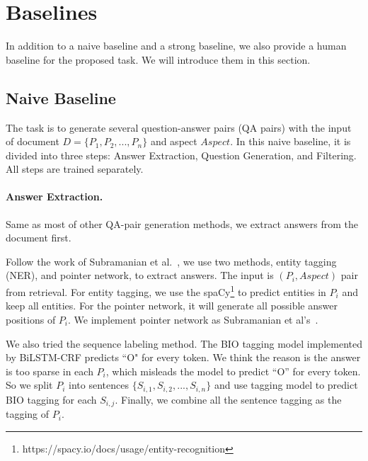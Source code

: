 \section{Baselines}
In addition to a naive baseline and a strong baseline, we also provide a human baseline for the proposed task. We will introduce them in this section.

\subsection{Naive Baseline} The task is to generate several question-answer pairs (QA pairs) with the input of document $D=\{P_1, P_2, ... , P_n\}$ and aspect $Aspect$. In this naive baseline, it is divided into three steps: Answer Extraction, Question Generation, and Filtering. All steps are trained separately.

\paragraph{Answer Extraction.} Same as most of other QA-pair generation methods, we extract answers from the document first.

Follow the work of Subramanian et al.~, we use two methods, entity tagging (NER), and pointer network, to extract answers.
The input is $(P_i, Aspect)$ pair from retrieval. For entity tagging, we use the spaCy\footnote{https://spacy.io/docs/usage/entity-recognition} to predict entities in $P_i$ and keep all entities. For the pointer network, it will generate all possible answer positions of $P_i$. We implement pointer network as Subramanian et al's~. 

We also tried the sequence labeling method. The BIO tagging model implemented by BiLSTM-CRF predicts ``O" for every token. We think the reason is the answer is too sparse in each $P_i$, which misleads the model to predict ``O'' for every token. So we split $P_i$ into sentences $\{S_{i,1}, S_{i,2}, ..., S_{i,n}\}$ and use tagging model to predict BIO tagging for each $S_{i,j}$. Finally, we combine all the sentence tagging as the tagging of $P_i$.

